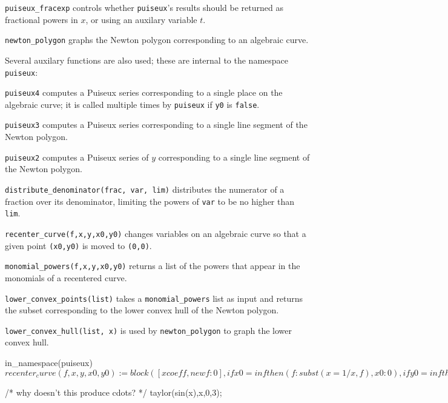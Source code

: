 {\tt puiseux_fracexp} controls whether {\tt puiseux}'s results
should be returned as fractional powers in $x$, or using
an auxilary variable $t$.

{\tt newton_polygon} graphs the Newton polygon corresponding to
an algebraic curve.

Several auxilary functions are also used; these are internal to
the namespace {\tt puiseux}:

{\tt puiseux4} computes a Puiseux series corresponding to a single
place on the algebraic curve; it is called multiple times by
{\tt puiseux} if {\tt y0} is {\tt false}.

{\tt puiseux3} computes a Puiseux series corresponding to a single
line segment of the Newton polygon.

{\tt puiseux2} computes a Puiseux series of $y$ corresponding to a
single line segment of the Newton polygon.

{\tt distribute_denominator(frac, var, lim)} distributes the numerator
of a fraction over its denominator, limiting the powers of {\tt var}
to be no higher than {\tt lim}.

{\tt recenter_curve(f,x,y,x0,y0)} changes variables on an algebraic curve
so that a given point {\tt (x0,y0)} is moved to {\tt (0,0)}.

{\tt monomial_powers(f,x,y,x0,y0)} returns a list of the powers that
appear in the monomials of a recentered curve.

{\tt lower_convex_points(list)} takes a {\tt monomial_powers} list as
input and returns the subset corresponding to the lower convex hull
of the Newton polygon.

{\tt lower_convex_hull(list, x)} is used by {\tt newton_polygon}
to graph the lower convex hull.

\vfill\eject

\begin{maximablock}
in_namespace(puiseux)$

recenter_curve(f,x,y,x0,y0) := block([xcoeff, newf:0],
   if x0 = inf then (f:subst(x=1/x, f), x0:0),
   if y0 = inf then (f:subst(y=1/y, f), y0:0),
   f : num(ratsimp(f)),
   f : expand(subst([y=y+y0, x=x+x0], f)),
   for xpow: 0 thru hipow(f, x) do (
      xcoeff : coeff(f, x, xpow),
      for ypow: 0 thru hipow(xcoeff, y) do
         newf : newf + radcan(ratsimp(coeff(xcoeff, y, ypow)))*x^xpow*y^ypow
   ),
   newf
)$
\end{maximablock}

\begin{maximablock}
/* why doesn't this produce cdots? */
taylor(sin(x),x,0,3);
\end{maximablock}

